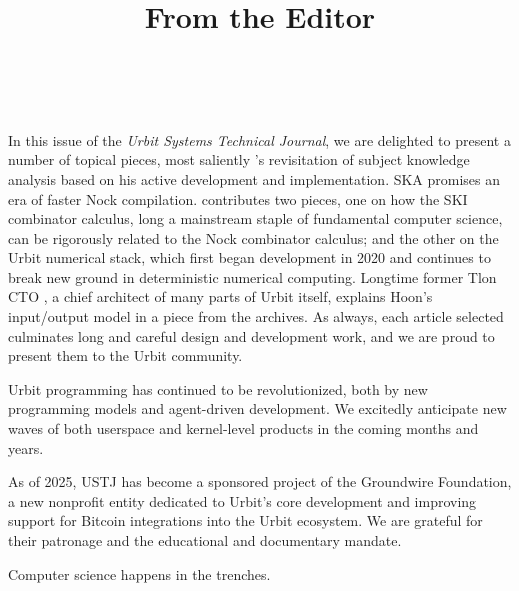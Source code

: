 \documentclass[twoside]{article}
\title{From the Editor}
\author{\authorname~\authorpatp \\ \affiliation}
\date{}
\begin{document}
\thispagestyle{firststyle}

\setcounter{page}{1}

\sloppy
In this issue of the \emph{Urbit Systems Technical Journal}, we are delighted to present a number of topical pieces, most saliently 's revisitation of subject knowledge analysis based on his active development and implementation.  SKA promises an era of faster Nock compilation.   contributes two pieces, one on how the SKI combinator calculus, long a mainstream staple of fundamental computer science, can be rigorously related to the Nock combinator calculus; and the other on the Urbit numerical stack, which first began development in 2020 and continues to break new ground in deterministic numerical computing.  Longtime former Tlon CTO , a chief architect of many parts of Urbit itself, explains Hoon's input/output model in a piece from the archives.  As always, each article selected culminates long and careful design and development work, and we are proud to present them to the Urbit community.

Urbit programming has continued to be revolutionized, both by new programming models and agent-driven development.  We excitedly anticipate new waves of both userspace and kernel-level products in the coming months and years.

As of 2025, USTJ has become a sponsored project of the Groundwire Foundation, a new nonprofit entity dedicated to Urbit's core development and improving support for Bitcoin integrations into the Urbit ecosystem.  We are grateful for their patronage and the educational and documentary mandate.

Computer science happens in the trenches.  \tombstone{}
\end{document}
